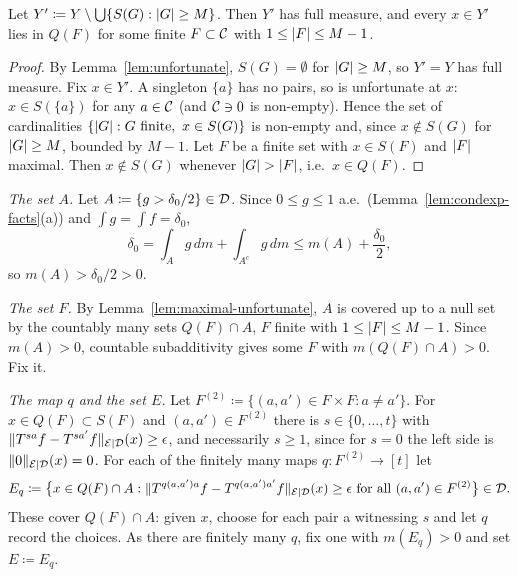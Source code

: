 \begin{lemma}
  \label{lem:maximal-unfortunate}
  \leanok
  Let $Y' \coloneqq Y \setminus \bigcup\{ S(G) : \lvert G \rvert \geq M \}$.  Then $Y'$ has full
  measure, and every $x \in Y'$ lies in $Q(F)$ for some finite $F \subset \mathcal{C}$ with
  $1 \leq \lvert F \rvert \leq M - 1$.
\end{lemma}

\begin{proof}
  By Lemma~\ref{lem:unfortunate}, $S(G) = \emptyset$ for $\lvert G \rvert \geq M$, so $Y' = Y$ has full
  measure.  Fix $x \in Y'$.  A singleton $\{a\}$ has no pairs, so is unfortunate at $x$:
  $x \in S(\{a\})$ for any $a \in \mathcal{C}$ (and $\mathcal{C} \ni 0$ is non-empty).  Hence the set
  of cardinalities $\{\lvert G \rvert : G \text{ finite},\ x \in S(G)\}$ is non-empty and, since
  $x \notin S(G)$ for $\lvert G \rvert \geq M$, bounded by $M - 1$.  Let $F$ be a finite set with
  $x \in S(F)$ and $\lvert F \rvert$ maximal.  Then $x \notin S(G)$ whenever $\lvert G \rvert > \lvert F \rvert$, i.e.\
  $x \in Q(F)$.
\end{proof}

\emph{The set $A$.}  Let $A \coloneqq \{g > \delta_0/2\} \in \mathcal{D}$.  Since $0 \leq g \leq 1$ a.e.\
(Lemma~\ref{lem:condexp-facts}(a)) and $\int g = \int f = \delta_0$,
\[
  \delta_0 = \int_A g\,dm + \int_{A^c} g\,dm \leq m(A) + \frac{\delta_0}{2} ,
\]
so $m(A) > \delta_0/2 > 0$.

\emph{The set $F$.}  By Lemma~\ref{lem:maximal-unfortunate}, $A$ is covered up to a null set by
the countably many sets $Q(F) \cap A$, $F$ finite with $1 \leq \lvert F \rvert \leq M-1$.  Since
$m(A) > 0$, countable subadditivity gives some $F$ with $m(Q(F) \cap A) > 0$.  Fix it.

\emph{The map $q$ and the set $E$.}  Let $F^{(2)} \coloneqq \{(a,a') \in F \times F : a \neq a'\}$.
For $x \in Q(F) \subset S(F)$ and $(a,a') \in F^{(2)}$ there is $s \in \{0,\dots,t\}$ with
$\lVert T^{sa}f - T^{sa'}f \rVert_{\mathcal{E} \mid \mathcal{D}}(x) \geq \epsilon$, and necessarily $s \geq 1$, since for $s = 0$ the
left side is $\lVert 0 \rVert_{\mathcal{E} \mid \mathcal{D}}(x) = 0$.  For each of the finitely many maps $q : F^{(2)} \to [t]$ let
\begin{equation}
  \label{eq:qmap}
  E_q \coloneqq \bigl\{ x \in Q(F) \cap A : \lVert T^{q(a,a')a}f - T^{q(a,a')a'}f \rVert_{\mathcal{E} \mid \mathcal{D}}(x) \geq \epsilon
    \text{ for all } (a,a') \in F^{(2)} \bigr\} \in \mathcal{D} .
\end{equation}
These cover $Q(F) \cap A$: given $x$, choose for each pair a witnessing $s$ and let $q$ record
the choices.  As there are finitely many $q$, fix one with $m(E_q) > 0$ and set
$E \coloneqq E_q$.

